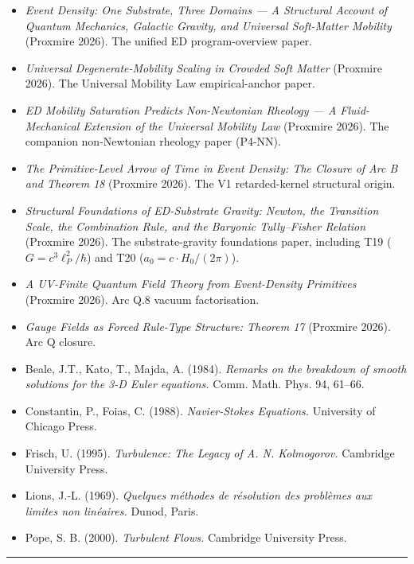 \documentclass[
  11pt,a4paper]{article}
\providecommand{\tightlist}{%
  \setlength{\itemsep}{0pt}\setlength{\parskip}{0pt}}
\begin{document}
\begin{itemize}
\tightlist
\item
  \emph{Event Density: One Substrate, Three Domains --- A Structural
  Account of Quantum Mechanics, Galactic Gravity, and Universal
  Soft-Matter Mobility} (Proxmire 2026). The unified ED program-overview
  paper.
\item
  \emph{Universal Degenerate-Mobility Scaling in Crowded Soft Matter}
  (Proxmire 2026). The Universal Mobility Law empirical-anchor paper.
\item
  \emph{ED Mobility Saturation Predicts Non-Newtonian Rheology --- A
  Fluid-Mechanical Extension of the Universal Mobility Law} (Proxmire
  2026). The companion non-Newtonian rheology paper (P4-NN).
\item
  \emph{The Primitive-Level Arrow of Time in Event Density: The Closure
  of Arc B and Theorem 18} (Proxmire 2026). The V1 retarded-kernel
  structural origin.
\item
  \emph{Structural Foundations of ED-Substrate Gravity: Newton, the
  Transition Scale, the Combination Rule, and the Baryonic Tully--Fisher
  Relation} (Proxmire 2026). The substrate-gravity foundations paper,
  including T19 (\(G = c^3 \ell_P^2/\hbar\)) and T20
  (\(a_0 = c \cdot H_0/(2\pi)\)).
\item
  \emph{A UV-Finite Quantum Field Theory from Event-Density Primitives}
  (Proxmire 2026). Arc Q.8 vacuum factorisation.
\item
  \emph{Gauge Fields as Forced Rule-Type Structure: Theorem 17}
  (Proxmire 2026). Arc Q closure.
\item
  Beale, J.T., Kato, T., Majda, A. (1984). \emph{Remarks on the
  breakdown of smooth solutions for the 3-D Euler equations.} Comm.
  Math. Phys. 94, 61--66.
\item
  Constantin, P., Foias, C. (1988). \emph{Navier-Stokes Equations.}
  University of Chicago Press.
\item
  Frisch, U. (1995). \emph{Turbulence: The Legacy of A. N. Kolmogorov.}
  Cambridge University Press.
\item
  Lions, J.-L. (1969). \emph{Quelques méthodes de résolution des
  problèmes aux limites non linéaires.} Dunod, Paris.
\item
  Pope, S. B. (2000). \emph{Turbulent Flows.} Cambridge University
  Press.
\end{itemize}

\begin{center}\rule{0.5\linewidth}{0.5pt}\end{center}
\end{document}
